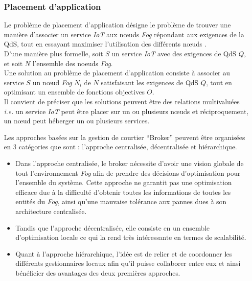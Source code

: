 \subsubsection{Placement d'application}
Le problème de placement d'application désigne le problème de trouver une manière d'associer un service \emph{IoT} aux nœuds \emph{Fog} répondant aux exigences de la QdS, tout en essayant maximiser l'utilisation des différents nœuds .\\
D'une manière plus formelle, soit $S$ un service \emph{IoT} avec des exigences de QdS $Q$, et soit $N$ l'ensemble des noeuds \emph{Fog}.\\
Une solution au problème de placement d'application consiste à associer au service $S$ un nœud \emph{Fog} $N_{i}$ de $N$ satisfaisant les exigences de QdS $Q$, tout en optimisant un ensemble de fonctions objectives $O$.\\
Il convient de préciser que les solutions peuvent être des relations multivaluées \emph{i.e.} un service \emph{IoT} peut être placer sur un ou plusieurs nœuds et réciproquement, un nœud peut héberger un ou plusieurs services.\par
Les approches basées sur la gestion de courtier “Broker” peuvent être organisées en 3 catégories que sont : l'approche centralisée, décentralisée et hiérarchique.
\begin{itemize}
  \item Dans l'approche centralisée, le broker nécessite d'avoir une vision globale de tout l'environnement \emph{Fog} afin de prendre des décisions d'optimisation pour l'ensemble du système. Cette approche ne garantit pas une optimisation efficace due à la difficulté d'obtenir toutes les informations de toutes les entités du \emph{Fog}, ainsi qu'une mauvaise tolérance aux pannes dues à son architecture centralisée.
  \item Tandis que  l'approche décentralisée, elle consiste en un ensemble d'optimisation locale ce qui la rend très intéressante en termes de scalabilité.
  \item Quant à l'approche hiérarchique, l'idée est  de relier et de coordonner les différents gestionnaires locaux afin qu'il puisse collaborer entre eux et ainsi bénéficier des avantages des deux premières approches. 
\end{itemize}
